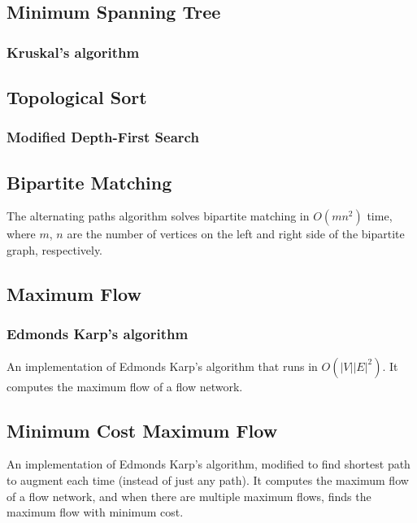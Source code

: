 \documentclass[10pt,a4paper,titlepage]{article}
\begin{document}
\subsection{Minimum Spanning Tree}
\subsubsection{Kruskal's algorithm}

\subsection{Topological Sort}
\subsubsection{Modified Depth-First Search}


\subsection{Bipartite Matching}
The alternating paths algorithm solves bipartite matching in $O(mn^2)$ time, where $m$, $n$ are the number of vertices on the left and right side of the bipartite graph, respectively.


\subsection{Maximum Flow}
\subsubsection{Edmonds Karp's algorithm}
An implementation of Edmonds Karp's algorithm that runs in $O(|V||E|^2)$. It computes the maximum flow of a flow network.

\subsection{Minimum Cost Maximum Flow}
An implementation of Edmonds Karp's algorithm, modified to find shortest path to augment each time (instead of just any path). It computes the maximum flow of a flow network, and when there are multiple maximum flows, finds the maximum flow with minimum cost.

\end{document}
